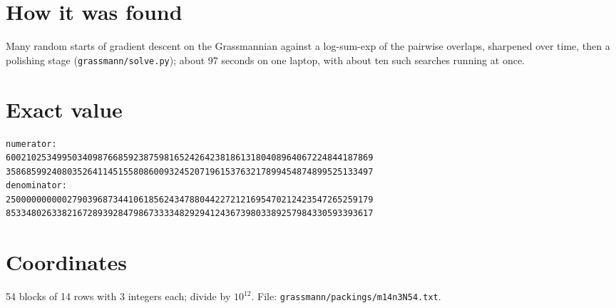 \documentclass[11pt,a4paper]{article}
\begin{document}
\section{How it was found}
Many random starts of gradient descent on the Grassmannian against a log-sum-exp of the pairwise overlaps, sharpened over time, then a polishing stage (\texttt{grassmann/solve.py}); about 97 seconds on one laptop, with about ten such searches running at once.


\appendix
\section{Exact value}
{\small
\begin{verbatim}
numerator:
600210253499503409876685923875981652426423818613180408964067224844187869
358685992408035264114515580860093245207196153763217899454874899525133497
denominator:
250000000000279039687344106185624347880442272121695470212423547265259179
853348026338216728939284798673333482929412436739803389257984330593393617
\end{verbatim}}

\section{Coordinates}
54 blocks of 14 rows with 3 integers each; divide by $10^{12}$. File: \texttt{grassmann/packings/m14n3N54.txt}.
{\tiny
\begin{multicols}{3}
\end{multicols}}
\end{document}
